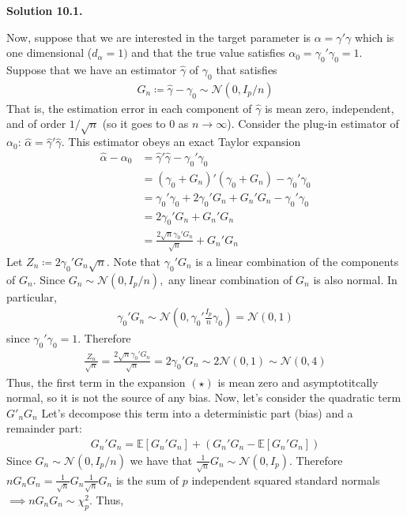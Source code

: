 \documentclass[11pt]{article}
\newenvironment{solution}[1]
    {\bigskip\noindent\textbf{Solution #1.} \par}
    {\medskip}
\newcommand{\ev}{\mathbb{E}}
\begin{document}
\begin{solution}{10.1}
Now, suppose that we are interested in the target parameter is $\alpha = \gamma'\gamma$ which is one dimensional ($d_{\alpha} = 1)$ and that the true value satisfies $\alpha_0 = \gamma_0'\gamma_0 = 1.$ Suppose that we have an estimator $\hat{\gamma}$ of $\gamma_0$ that satisfies
\begin{align*}
    G_n \coloneq \hat{\gamma} - \gamma_0 \sim \mathcal{N}(0,I_p/n)
\end{align*}
That is, the estimation error in each component of $\hat{\gamma}$ is mean zero, independent, and of order $1/\sqrt{n}$ (so it goes to 0 as $n \to \infty$). Consider the plug-in estimator of $\alpha_0$: $\hat{\alpha} = \hat{\gamma}'\hat{\gamma}.$ This estimator obeys an exact Taylor expansion
\begin{align*}
    \hat{\alpha} - \alpha_0 
    &=\hat{\gamma}'\hat{\gamma} - \gamma_0'\gamma_0\\
    &= (\gamma_0 + G_n )'(\gamma_0 +G_n) - \gamma_0'\gamma_0 \\
    &= \gamma_0'\gamma_0 + 2\gamma_0'G_n + G_n'G_n - \gamma_0'\gamma_0 \\
    &=  2\gamma_0'G_n + G_n'G_n \\
    &= \frac{2\sqrt{n}\gamma_0'G_n}{\sqrt{n}} + G_n'G_n \tag{$\star$}
\end{align*}
Let $Z_n \coloneq 2\gamma_0'G_n\sqrt{n}.$ Note that  $\gamma_0'G_n$ is a linear combination of the components of $G_n.$ Since $G_n \sim \mathcal{N}(0,I_p/n),$ any linear combination of $G_n$ is also normal. In particular, 
\begin{align*}
    \gamma_0'G_n \sim \mathcal{N}(0,\gamma_0'\frac{I_p}{n}\gamma_0) = \mathcal{N}(0,1)
\end{align*}
since $\gamma_0'\gamma_0 = 1.$ Therefore 
\begin{align*}
    \frac{Z_n}{\sqrt{n}} = \frac{2\sqrt{n}\gamma_0'G_n}{\sqrt{n}} = 2\gamma_0'G_n \sim 2\mathcal{N}(0,1) \sim \mathcal{N}(0,4)
\end{align*}
Thus, the first term in the expansion $(\star)$ is mean zero and asymptotitcally normal, so it is not the source of any bias. Now, let's consider the quadratic term $G'_nG_n$ Let's decompose this term into a deterministic part (bias) and a remainder part:
\begin{align*}
    G_n'G_n = \ev[G_n'G_n ] + (G_n'G_n - \ev[G_n'G_n ])
\end{align*}
Since $G_n \sim \mathcal{N}(0,I_p/n)$ we have that $\frac{1}{\sqrt{n}}G_n\sim\mathcal{N}(0,I_p).$ Therefore $nG_nG_n = \frac{1}{\sqrt{n}}G_n\frac{1}{\sqrt{n}}G_n$ is the sum of $p$ independent squared standard normals $\implies nG_nG_n \sim \chi^2_p.$ Thus, 

\end{solution}
\end{document}
